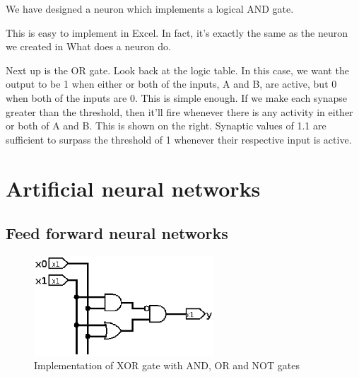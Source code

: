We have designed a neuron which implements a logical AND gate.  

This is easy to implement in Excel.  In fact, it's exactly the same as the neuron we 
created in What does a neuron do.  

Next up is the OR gate.  Look back at the logic table.  In this case, we want the output to 
be 1 when either or both of the inputs, A and B, are active, but 0 when both of the inputs are 0.  
This is simple enough.  If we make each synapse greater than the threshold, 
then it'll fire whenever there is any activity in either or both of A and B.
This is shown on the right.  Synaptic values of 1.1 are sufficient to surpass 
the threshold of 1 whenever their respective input is active.  
	

\section{Artificial neural networks}

\subsection{Feed forward neural networks}
\FloatBarrier

\begin{figure}[htb] 
	\label{fig:xor_gates}
	\centering
	\includegraphics[width=0.6\textwidth]{figures/xor_gates}
	\caption{Implementation of XOR gate with AND, OR and NOT gates}
\end{figure}

